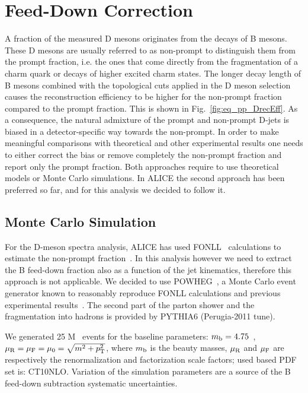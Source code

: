 \section{Feed-Down Correction}
\label{sec:FD}

A fraction of the measured D mesons originates from the decays of B mesons. These D mesons are usually referred to as non-prompt
to distinguish them from the prompt fraction, i.e. the ones that come directly from the fragmentation of a charm quark or decays of higher excited charm states.
The longer decay length of B mesons combined with the topological cuts applied in the D meson selection causes the reconstruction efficiency 
to be higher for the non-prompt fraction compared to the prompt fraction. This is shown in Fig.~\ref{fig:eq_pp_DrecEff}.
As a consequence, the natural admixture of the prompt and non-prompt D-jets is biased in a detector-specific way towards the non-prompt.
In order to make meaningful comparisons with theoretical and other experimental results one needs to either correct the bias or remove completely the non-prompt fraction and report only the prompt fraction. 
Both approaches require to use theoretical models or Monte Carlo simulations.
In ALICE the second approach has been preferred so far, and for this analysis we decided to follow it.

\subsection{Monte Carlo Simulation}

For the D-meson spectra analysis, ALICE has used FONLL~\cite{Cacciari:1998} calculations to estimate the non-prompt fraction~\cite{ALICE:2011aa, ALICE:2014d, ALICE:2016a}.
In this analysis however we need to extract the B feed-down fraction also as a function of the jet kinematics, therefore this approach is not applicable.
We decided to use POWHEG~\cite{Alioli:2010}, a Monte Carlo event generator known to reasonably reproduce FONLL calculations and previous experimental results~\cite{Cacciari:2012b}.
The second part of the parton shower and the fragmentation into hadrons is provided by PYTHIA6 (Perugia-2011 tune).

We generated 25 M \bbbar\ events for the baseline parameters: 
$m_{\rm b} = 4.75$~\GeVcsq, $\mu_{\rm R} = \mu_{\rm F} =\mu_{0} = \sqrt{m^2+p_{\rm T}^2}$,
where $m_{\rm b}$ is the beauty masses, $\mu_{\rm R}$ and $\mu_{\rm F}$ are respectively the renormalization and factorization scale factors; used based PDF set is: CT10NLO.
Variation of the simulation parameters are a source of the B feed-down subtraction systematic uncertainties.

